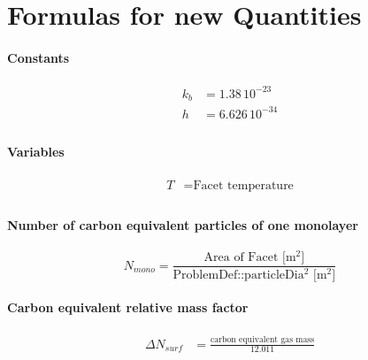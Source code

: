 
\chapter{Formulas for new Quantities}\label{chapter:Formulas}

\subsubsection*{Constants}
\begin{equation}
	\begin{split}
	k_b&=1.38\,10^{-23}\\
	h&=6.626\,10^{-34}\\
	\end{split}
\end{equation}


\subsubsection*{Variables}
\begin{equation}
	\begin{split}
	T&=\text{Facet temperature}\\
	\end{split}
\end{equation}

\subsubsection*{Number of carbon equivalent particles of one monolayer}
\begin{equation}
	\label{eq:nmono}
	N_{mono}=\frac{\text{Area of Facet [m$^2$]}}{\text{ProblemDef::particleDia$^2$ [m$^2$]}}
\end{equation}

\subsubsection*{Carbon equivalent relative mass factor}
\begin{equation}
	\label{eq:nsurf}
	\begin{split}
	\Delta N_{surf}&=\frac{\text{carbon equivalent gas mass}}{12.011}\\
	\end{split}
\end{equation}

